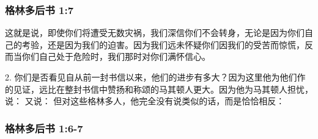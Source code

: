 
\subsubsection{格林多后书 1:7}

这就是说，即使你们将遭受无数灾祸，我们深信你们不会转身，无论是因为你们自己的考验，还是因为我们的迫害。因为我们远未怀疑你们因我们的受苦而惊慌，反而当你们自己处于危险时，我们那时对你们满怀信心。\par

2. 你们是否看见自从前一封书信以来，他们的进步有多大？因为这里他为他们作的见证，远比在整封书信中赞扬和称颂的马其顿人更大。因为他为马其顿人担忧，说： 又说： 但对这些格林多人，他完全没有说类似的话，而是恰恰相反：\par


\subsubsection{格林多后书 1:6-7}

\par

